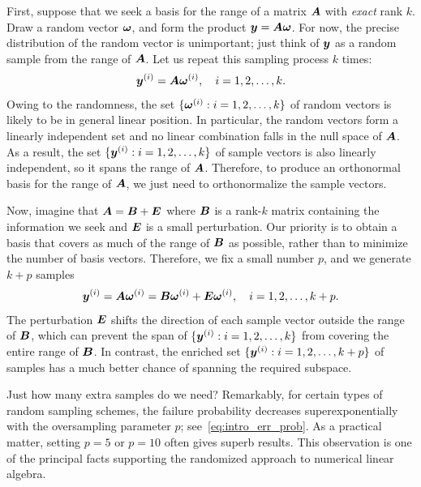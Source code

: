 \documentclass[final]{siamltex}
\newcommand{\notate}[1]{\textcolor{red}{\textbf{[#1]}}}
\begin{document}
First, suppose that we seek a basis for the range of a matrix $\bm{A}$ with
\textit{exact} rank $k$. Draw a random vector $\bm{\omega}$,
and form the product $\bm{y} = \bm{A} \bm{\omega}$.
For now, the precise distribution of the random vector is
unimportant; just think of $\bm{y}$ as a random sample from the
range of $\bm{A}$. Let us repeat this sampling process $k$ times:
\begin{equation}
\label{eq:samples}
\vct{y}^{(i)} = \mtx{A} \vct{\omega}^{(i)},
\quad
i = 1, 2, \dots, k.
\end{equation}
Owing to the randomness, the set $\{ \bm{\omega}^{(i)} : i = 1, 2, \dots, k \}$ of
random vectors is likely to be in general linear position.
In particular, the random vectors form a linearly independent set and
no linear combination falls in the null space of $\bm{A}$.  As a
result, the set $\{ \bm{y}^{(i)} : i = 1, 2, \dots, k \}$ of sample vectors is
also linearly independent, so it spans the range of $\bm{A}$.
Therefore, to produce an orthonormal basis for the range of
$\bm{A}$, we just need to orthonormalize the sample vectors.


Now, imagine that $\bm{A} = \bm{B} + \bm{E}$ where $\bm{B}$ is a rank-$k$
matrix containing the information we seek and $\bm{E}$ is a small
perturbation.  Our priority is to obtain a basis that covers as much of the
range of $\bm{B}$ as possible, rather than to minimize the number of basis vectors.
Therefore, we fix a small number $p$, %
and we generate $k+p$ samples
\begin{equation}
\bm{y}^{(i)} = \bm{A} \bm{\omega}^{(i)}
	= \bm{B} \bm{\omega}^{(i)} + \bm{E} \bm{\omega}^{(i)},
\quad
i = 1, 2, \dots, k + p.
\end{equation}
The perturbation $\bm{E}$ shifts the direction of each sample
vector outside the range of $\bm{B}$, which can prevent the span of
$\{\bm{y}^{(i)} : i = 1, 2, \dots, k \}$ from covering
the entire range of $\bm{B}$.  In contrast, the enriched set
$\{\bm{y}^{(i)} :  i = 1, 2, \dots, k + p \}$ of samples has a much better chance
of spanning the required subspace.

Just how many extra samples do we need?  Remarkably,
for certain types of random sampling schemes,
the failure probability decreases superexponentially with
the oversampling parameter $p$; see~\eqref{eq:intro_err_prob}.
As a practical matter, setting $p = 5$ or $p = 10$
often gives superb results.
This observation is one of the principal facts supporting the randomized
approach to numerical linear algebra.
\end{document}
